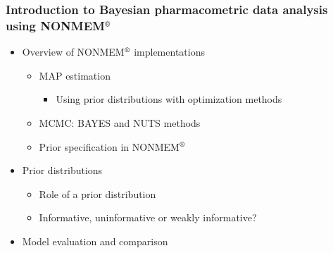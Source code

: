 \documentclass[handout]{beamer}
\begin{document}
\begin{frame}
  \frametitle{Introduction to Bayesian pharmacometric data analysis
    using NONMEM$^\text{\textregistered}$}

  \vspace{-10pt}
  \begin{itemize}
  \item Overview of NONMEM$^\text{\textregistered}$ implementations
    \begin{itemize}
    \item MAP estimation
      \begin{itemize}
      \item Using prior distributions with optimization methods
      \end{itemize}
    \item MCMC: BAYES and NUTS methods
    \item Prior specification in NONMEM$^\text{\textregistered}$
    \end{itemize}
  \end{itemize}
  \begin{itemize}
  \item Prior distributions
    \begin{itemize}
    \item Role of a prior distribution
    \item Informative, uninformative or weakly informative?
    \end{itemize}
  \end{itemize}
  \begin{itemize}
  \item Model evaluation and comparison
  \end{itemize}

\end{frame}
\end{document}
